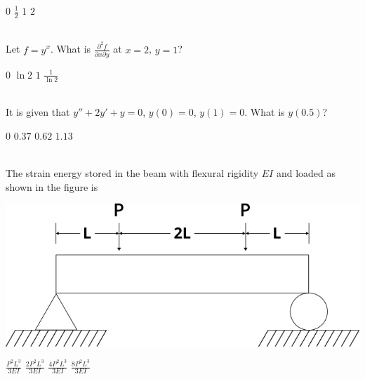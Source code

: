 \documentclass[addpoints,11pt]{exam}
\begin{document}
\begin{questions}
        \begin{oneparchoices}
            \choice $0$
            \choice $\frac{1}{2}$
            \choice $1$
            \choice $2$
        \end{oneparchoices}\\

        \question Let $f = y^x$. What is $\frac{\partial^2 f}{\partial{x}\partial{y}}$ at $x=2$, $y=1$?\\

        \begin{oneparchoices}
            \choice $0$
            \choice $\ln 2$
            \choice $1$
            \choice $\frac{1}{\ln 2}$
        \end{oneparchoices}\\

        \question It is given that $y'' + 2y' + y=0$, $y(0)=0$, $y(1)=0$. What is $y(0.5)$?\\

        \begin{oneparchoices}
            \choice $0$
            \choice $0.37$
            \choice $0.62$
            \choice $1.13$
        \end{oneparchoices}\\

        \question The strain energy stored in the beam with flexural rigidity $EI$ and loaded as shown in the figure is\\

        \begin{center}
            \includegraphics[scale=0.5]{q30}
        \end{center}

        \begin{oneparchoices}
            \choice $\frac{P^2L^3}{3EI}$
            \choice $\frac{2P^2L^3}{3EI}$
            \choice $\frac{4P^2L^3}{3EI}$
            \choice $\frac{8P^2L^3}{3EI}$
        \end{oneparchoices}\\


\end{questions}
\end{document}
